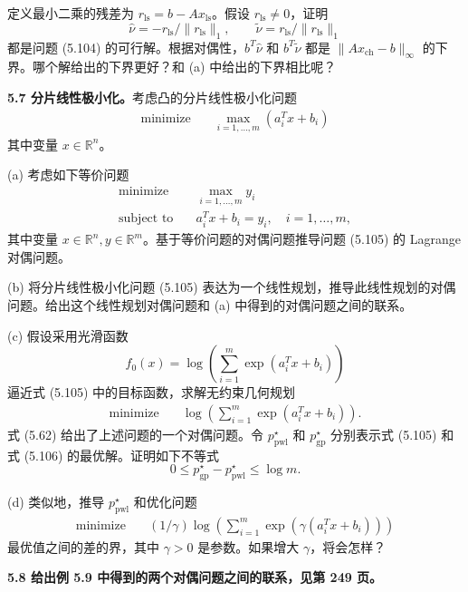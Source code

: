 \documentclass[UTF8,12pt,a4paper,fontset=fandol]{ctexart}
\begin{document}
定义最小二乘的残差为 $r_{\mathrm{ls}}=b-Ax_{\mathrm{ls}}$。假设 $r_{\mathrm{ls}}\neq 0$，证明
\[
\hat{\nu}=-r_{\mathrm{ls}}/\|r_{\mathrm{ls}}\|_1,\qquad \tilde{\nu}=r_{\mathrm{ls}}/\|r_{\mathrm{ls}}\|_1
\]
都是问题 (5.104) 的可行解。根据对偶性，$b^T\hat{\nu}$ 和 $b^T\tilde{\nu}$ 都是 $\|Ax_{\mathrm{ch}}-b\|_\infty$ 的下界。哪个解给出的下界更好？和 (a) 中给出的下界相比呢？

\noindent\textbf{5.7 分片线性极小化。}\quad 考虑凸的分片线性极小化问题
\begin{equation}
\begin{aligned}
\text{minimize}\quad & \max_{i=1,\ldots,m}(a_i^Tx+b_i)
\end{aligned}
\tag{5.105}
\end{equation}
其中变量 $x\in\mathbb{R}^n$。

(a) 考虑如下等价问题
\[
\begin{aligned}
\text{minimize}\quad & \max_{i=1,\ldots,m}y_i\\
\text{subject to}\quad & a_i^Tx+b_i=y_i,\quad i=1,\ldots,m,
\end{aligned}
\]
其中变量 $x\in\mathbb{R}^n, y\in\mathbb{R}^m$。基于等价问题的对偶问题推导问题 (5.105) 的 Lagrange 对偶问题。

(b) 将分片线性极小化问题 (5.105) 表达为一个线性规划，推导此线性规划的对偶问题。给出这个线性规划对偶问题和 (a) 中得到的对偶问题之间的联系。

(c) 假设采用光滑函数
\[
f_0(x)=\log\left(\sum_{i=1}^m\exp(a_i^Tx+b_i)\right)
\]
逼近式 (5.105) 中的目标函数，求解无约束几何规划
\begin{equation}
\begin{aligned}
\text{minimize}\quad & \log\left(\sum_{i=1}^m\exp(a_i^Tx+b_i)\right).
\end{aligned}
\tag{5.106}
\end{equation}
式 (5.62) 给出了上述问题的一个对偶问题。令 $p_{\mathrm{pwl}}^\star$ 和 $p_{\mathrm{gp}}^\star$ 分别表示式 (5.105) 和式 (5.106) 的最优解。证明如下不等式
\[
0\leq p_{\mathrm{gp}}^\star-p_{\mathrm{pwl}}^\star\leq \log m.
\]

(d) 类似地，推导 $p_{\mathrm{pwl}}^\star$ 和优化问题
\[
\begin{aligned}
\text{minimize}\quad & (1/\gamma)\log\left(\sum_{i=1}^m\exp(\gamma(a_i^Tx+b_i))\right)
\end{aligned}
\]
最优值之间的差的界，其中 $\gamma>0$ 是参数。如果增大 $\gamma$，将会怎样？

\noindent\textbf{5.8 给出例 5.9 中得到的两个对偶问题之间的联系，见第 249 页。}
\end{document}
